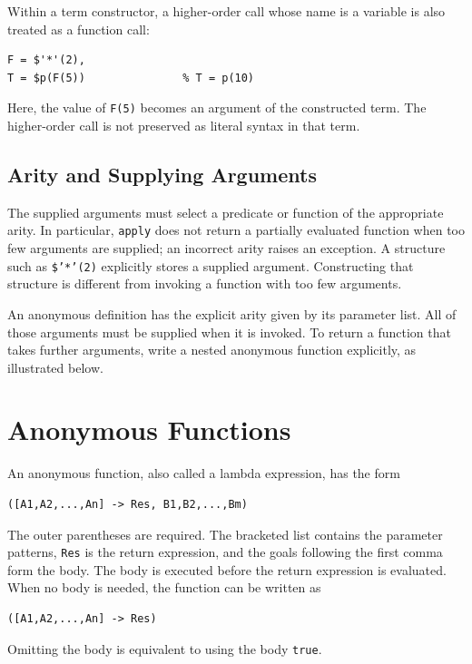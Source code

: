 Within a term constructor, a higher-order call whose name is a variable is
also treated as a function call:
\begin{verbatim}
F = $'*'(2),
T = $p(F(5))               % T = p(10)
\end{verbatim}
Here, the value of \texttt{F(5)} becomes an argument of the constructed term.
The higher-order call is not preserved as literal syntax in that term.

\subsection{Arity and Supplying Arguments}
The supplied arguments must select a predicate or function of the appropriate
arity. In particular, \texttt{apply} does not return a partially evaluated
function when too few arguments are supplied; an incorrect arity raises an
exception. A structure such as \texttt{\$'*'(2)} explicitly stores a supplied
argument. Constructing that structure is different from invoking a function
with too few arguments.

An anonymous definition has the explicit arity given by its parameter list.
All of those arguments must be supplied when it is invoked. To return a
function that takes further arguments, write a nested anonymous function
explicitly, as illustrated below.

\section{Anonymous Functions}
\label{section:anonymous-functions}

An anonymous function, also called a lambda expression, has the form
\begin{verbatim}
([A1,A2,...,An] -> Res, B1,B2,...,Bm)
\end{verbatim}
The outer parentheses are required. The bracketed list contains the parameter
patterns, \texttt{Res} is the return expression, and the goals following the
first comma form the body. The body is executed before the return expression
is evaluated. When no body is needed, the function can be written as
\begin{verbatim}
([A1,A2,...,An] -> Res)
\end{verbatim}
Omitting the body is equivalent to using the body \texttt{true}.

